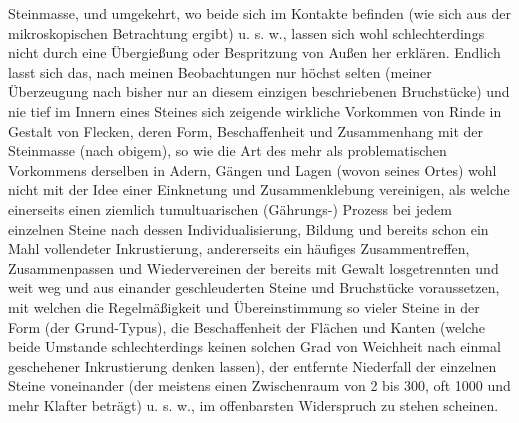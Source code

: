 \documentclass[a4paper, 11pt, oneside, german]{article}
\begin{document}
Steinmasse, und umgekehrt, wo beide sich im Kontakte befinden (wie sich aus der mikroskopischen Betrachtung ergibt) u. s. w., lassen sich wohl schlechterdings nicht durch eine Übergießung oder Bespritzung von Außen her erklären. Endlich lasst sich das, nach meinen Beobachtungen nur höchst selten (meiner Überzeugung nach bisher nur an diesem einzigen beschriebenen Bruchstücke) und nie tief im Innern eines Steines sich zeigende wirkliche Vorkommen von Rinde in Gestalt von Flecken, deren Form, Beschaffenheit und Zusammenhang mit der Steinmasse (nach obigem), so wie die Art des mehr als problematischen Vorkommens derselben in Adern, Gängen und Lagen (wovon seines Ortes) wohl nicht mit der Idee einer Einknetung und Zusammenklebung vereinigen, als welche einerseits einen ziemlich tumultuarischen (Gährungs-) Prozess bei jedem einzelnen Steine nach dessen Individualisierung, Bildung und bereits schon ein Mahl vollendeter Inkrustierung, andererseits ein häufiges Zusammentreffen, Zusammenpassen und Wiedervereinen der bereits mit Gewalt losgetrennten und weit weg und aus einander geschleuderten Steine und Bruchstücke voraussetzen, mit welchen die Regelmäßigkeit und Übereinstimmung so vieler Steine in der Form (der Grund-Typus), die Beschaffenheit der Flächen und Kanten (welche beide Umstande schlechterdings keinen solchen Grad von Weichheit nach einmal geschehener Inkrustierung denken lassen), der entfernte Niederfall der einzelnen Steine voneinander (der meistens einen Zwischenraum von 2 bis 300, oft 1000 und mehr Klafter beträgt) u. s. w., im offenbarsten Widerspruch zu stehen scheinen.  
\end{document}
